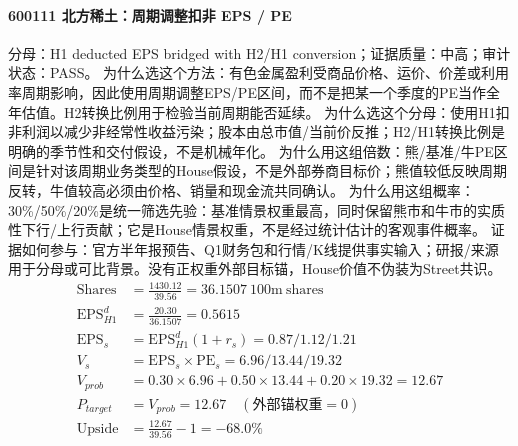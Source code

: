 \paragraph{600111 北方稀土：周期调整扣非 EPS / PE}
分母：H1 deducted EPS bridged with H2/H1 conversion；证据质量：中高；审计状态：PASS。
为什么选这个方法：有色金属盈利受商品价格、运价、价差或利用率周期影响，因此使用周期调整EPS/PE区间，而不是把某一个季度的PE当作全年估值。H2转换比例用于检验当前周期能否延续。
为什么选这个分母：使用H1扣非利润以减少非经常性收益污染；股本由总市值/当前价反推；H2/H1转换比例是明确的季节性和交付假设，不是机械年化。
为什么用这组倍数：熊/基准/牛PE区间是针对该周期业务类型的House假设，不是外部券商目标价；熊值较低反映周期反转，牛值较高必须由价格、销量和现金流共同确认。
为什么用这组概率：30\%/50\%/20\%是统一筛选先验：基准情景权重最高，同时保留熊市和牛市的实质性下行/上行贡献；它是House情景权重，不是经过统计估计的客观事件概率。
证据如何参与：官方半年报预告、Q1财务包和行情/K线提供事实输入；研报/来源用于分母或可比背景。没有正权重外部目标锚，House价值不伪装为Street共识。
\begin{align*}
\mathrm{Shares} &= \frac{1430.12}{39.56}=36.1507\ \mathrm{100m\ shares}\\
\mathrm{EPS}_{H1}^d &= \frac{20.30}{36.1507}=0.5615\\
\mathrm{EPS}_s &= \mathrm{EPS}_{H1}^d(1+r_s)=0.87/1.12/1.21\\
V_s &= \mathrm{EPS}_s\times \mathrm{PE}_s=6.96/13.44/19.32\\
V_{prob} &= 0.30\times 6.96+0.50\times 13.44+0.20\times 19.32=12.67\\
P_{target} &= V_{prob}=12.67\quad(\text{外部锚权重}=0)\\
\mathrm{Upside} &= \frac{12.67}{39.56}-1=-68.0\%\\
\end{align*}

